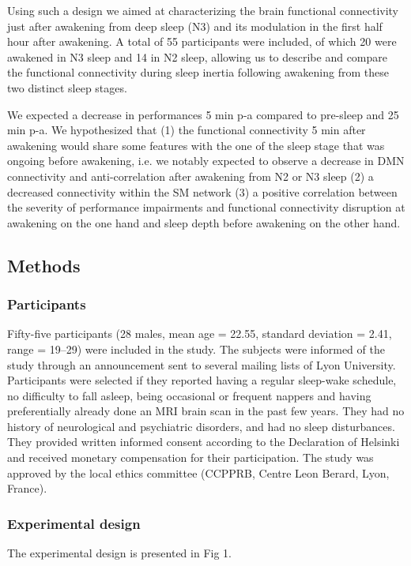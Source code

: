 Using such a design we aimed at characterizing the brain functional connectivity just after awakening from deep sleep (N3) and its modulation in the first half hour after awakening. A total of 55 participants were included, of which 20 were awakened in N3 sleep and 14 in N2 sleep, allowing us to describe and compare the functional connectivity during sleep inertia following awakening from these two distinct sleep stages.

We expected a decrease in performances 5 min p-a compared to pre-sleep and 25 min p-a. We hypothesized that (1) the functional connectivity 5 min after awakening would share some features with the one of the sleep stage that was ongoing before awakening, i.e. we notably expected to observe a decrease in DMN connectivity and anti-correlation after awakening from N2 or N3 sleep (2) a decreased connectivity within the SM network (3) a positive correlation between the severity of performance impairments and functional connectivity disruption at awakening on the one hand and sleep depth before awakening on the other hand.

\subsection*{Methods}
\label{res:inertia:inertia:methods}

\subsubsection*{Participants}
Fifty-five participants (28 males, mean age = 22.55, standard deviation = 2.41, range = 19–29) were included in the study. The subjects were informed of the study through an announcement sent to several mailing lists of Lyon University. Participants were selected if they reported having a regular sleep-wake schedule, no difficulty to fall asleep, being occasional or frequent nappers and having preferentially already done an MRI brain scan in the past few years. They had no history of neurological and psychiatric disorders, and had no sleep disturbances. They provided written informed consent according to the Declaration of Helsinki and received monetary compensation for their participation. The study was approved by the local ethics committee (CCPPRB, Centre Leon Berard, Lyon, France).

\subsubsection*{Experimental design}
The experimental design is presented in Fig 1.

